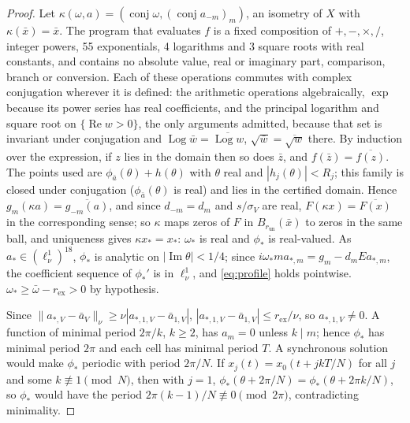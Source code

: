 \documentclass[11pt]{article}
\theoremstyle{definition}
\newcommand{\re}{\operatorname{Re}}
\newcommand{\im}{\operatorname{Im}}
\begin{document}
\begin{proof}
Let $\kappa(\omega, a) = (\operatorname{conj}\omega, (\operatorname{conj} a_{-m})_m)$, an isometry of $X$ with $\kappa(\bar x) = \bar x$. The program  that evaluates $f$ is a fixed composition of $+, -, \times, /$, integer powers, 55 exponentials, 4 logarithms and 3 square roots with real constants, and contains no absolute value, real or imaginary part, comparison, branch or conversion. Each of these operations commutes with complex conjugation wherever it is defined: the arithmetic operations algebraically, $\exp$ because its power series has real coefficients, and the principal logarithm and square root on $\{\re w > 0\}$, the only arguments admitted, because that set is invariant under conjugation and $\operatorname{Log}\bar w = \overline{\operatorname{Log} w}$, $\sqrt{\bar w} = \overline{\sqrt w}$ there. By induction over the expression, if $z$ lies in the domain then so does $\bar z$, and $f(\bar z) = \overline{f(z)}$. The points used are $\phi_{\bar a}(\theta) + h(\theta)$ with $\theta$ real and $|h_j(\theta)| < R_j$; this family is closed under conjugation ($\phi_{\bar a}(\theta)$ is real) and lies in the certified domain. Hence $g_m(\kappa a) = \overline{g_{-m}(a)}$, and since $d_{-m} = d_m$ and $s/\sigma_V$ are real, $F(\kappa x) = \overline{F(x)}$ in the corresponding sense; so $\kappa$ maps zeros of $F$ in $B_{r_{\mathrm{un}}}(\bar x)$ to zeros in the same ball, and uniqueness gives $\kappa x_* = x_*$: $\omega_*$ is real and $\phi_*$ is real-valued. As $a_* \in (\ell^1_\nu)^{18}$, $\phi_*$ is analytic on $|\im\theta| < 1/4$; since $i\omega_* m a_{*,m} = g_m - d_m E a_{*,m}$, the coefficient sequence of $\phi_*'$ is in $\ell^1_\nu$, and \eqref{eq:profile} holds pointwise. $\omega_* \ge \bar\omega - r_{\mathrm{ex}} > 0$ by hypothesis.

Since $\|a_{*,V} - \bar a_V\|_\nu \ge \nu|a_{*,1,V} - \bar a_{1,V}|$, $|a_{*,1,V} - \bar a_{1,V}| \le r_{\mathrm{ex}}/\nu$, so $a_{*,1,V} \ne 0$. A function of minimal period $2\pi/k$, $k \ge 2$, has $a_m = 0$ unless $k \mid m$; hence $\phi_*$ has minimal period $2\pi$ and each cell has minimal period $T$. A synchronous solution would make $\phi_*$ periodic with period $2\pi/N$. If $x_j(t) = x_0(t + jkT/N)$ for all $j$ and some $k \not\equiv 1 \pmod N$, then with $j = 1$, $\phi_*(\theta + 2\pi/N) = \phi_*(\theta + 2\pi k/N)$, so $\phi_*$ would have the period $2\pi(k-1)/N \not\equiv 0 \pmod{2\pi}$, contradicting minimality.
\end{proof}
\end{document}
